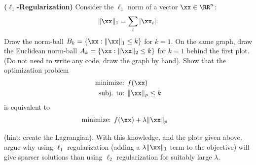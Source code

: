 \documentclass[12pt,letterpaper,fleqn]{hmcpset}
\begin{document}
\begin{problem}[2]
\textbf{($\ell_1$-Regularization)} Consider the $\ell_1$ norm of a vector $\xx\in\RR^n$:
\[
    \|\xx\|_1 = \sum_i |\xx_i|.
\]
Draw the norm-ball $B_k = \{\xx : \|\xx\|_1 \leq k\}$ for $k=1$. On the same graph, draw the Euclidean norm-ball $A_k = \{\xx : \|\xx\|_2 \leq k\}$ for $k=1$ behind the first plot. (Do not need to write any code, draw the graph by hand).
\newline
\newline
Show that the optimization problem
\begin{align*}
    \text{minimize: } & f(\xx)\\
    \text{subj. to: } & \|\xx\|_p \leq k
\end{align*}
is equivalent to
\begin{align*}
    \text{minimize: } & f(\xx) + \lambda\|\xx\|_p
\end{align*}

(hint: create the Lagrangian). With this knowledge, and the plots given above, argue why
using $\ell_1$ regularization (adding a $\lambda\|\xx\|_1$ term to the objective) will give
sparser solutions than using $\ell_2$ regularization for suitably large $\lambda$.
\end{problem}
\end{document}
